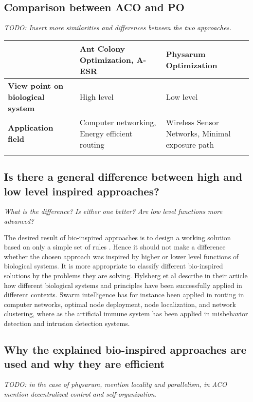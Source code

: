 \documentclass{IWORK2014}
\begin{document}
\subsection{Comparison between ACO and PO}
\textit{TODO: Insert more similarities and differences between the two approaches.}
\begin{table}[h]
\begin{tabular}{|l|l|l|}
\hline
                                         & \textbf{Ant Colony Optimization, A-ESR}       & \textbf{Physarum Optimization}              \\ \hline
\textbf{View point on biological system} & High level                                    & Low level                                   \\ \hline
\textbf{Application field}               & Computer networking, Energy efficient routing & Wireless Sensor Networks, Minimal exposure path \\ \hline
                                         &                                               &                                             \\ \hline
\end{tabular}
\end{table}

\subsection{Is there a general difference between high and low level inspired approaches?}
\textit{What is the difference? Is either one better? Are low level functions more advanced?}

The desired result of bio-inspired approaches is to design a working solution based on only a simple set of rules \cite{dressler2010bio}. Hence it should not make a difference whether the chosen approach was inspired by higher or lower level functions of biological systems. It is more appropriate to classify different bio-inspired solutions by the problems they are solving. Hylsberg et al describe in their article \cite{hylsberg2011bioinspired} how different biological systems and principles have been successfully applied in different contexts. Swarm intelligence has for instance been applied in routing in computer networks, optimal node deployment, node localization, and network clustering, where as the artificial immune system has been applied in misbehavior detection and intrusion detection systems.

\subsection{Why the explained bio-inspired approaches are used and why they are efficient}
\textit{TODO: in the case of physarum, mention locality and parallelism, in ACO mention decentralized control and self-organization.}
\end{document}
